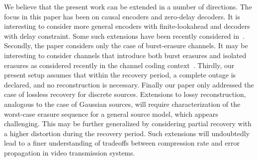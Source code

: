 \documentclass[journal, twocolumn, 10pt]{IEEEtran}
\begin{document}
{We believe that the present work can be extended in a number of directions. The focus in this paper has been on {causal encoders and zero-delay decoders. It is interesting to consider more general encoders with finite-lookahead and decoders with delay constraint. Some such extensions have been recently considered in~\cite{etezadi-khisti-14}. Secondly, the paper considers} only the case of burst-erasure channels. It may be interesting to consider channels that introduce both burst erasures and isolated erasures as considered recently in the channel coding context~\cite{badrinfo:13}. Thirdly, our present setup assumes that within the recovery period, a complete outage is declared, and no reconstruction is necessary. Finally our paper only addressed the case of lossless recovery for discrete sources. Extensions to lossy reconstruction, analogous to the case of Gaussian sources, will require characterization of the worst-case erasure sequence for a general source model, which appears challenging. This may be further generalized by considering partial recovery with a higher distortion during the recovery period. Such extensions will undoubtedly lead to a finer understanding of tradeoffs between compression rate and error propagation  in video transmission systems. 

%
\appendices
}
\end{document}
